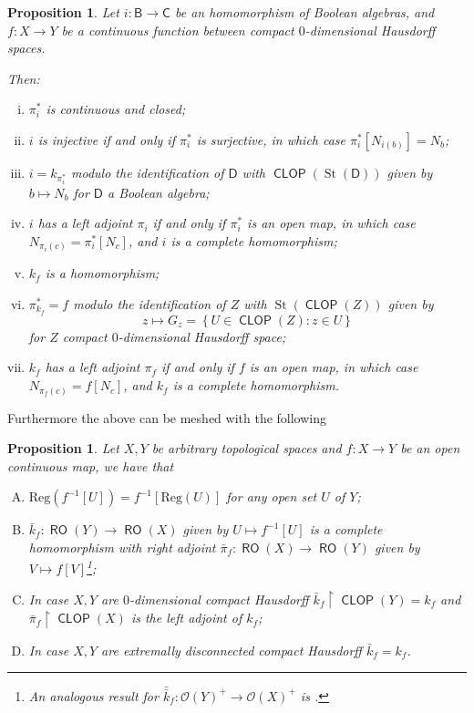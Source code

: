 \documentclass[11pt]{amsart}
\theoremstyle{plain}
\newtheorem{proposition}[theorem]{Proposition}
\theoremstyle{definition}
\theoremstyle{plain}
\theoremstyle{remark}
\DeclareMathOperator{\St}{St}
\DeclareMathOperator{\RO}{\mathsf{RO}}
\DeclareMathOperator{\CLOP}{\mathsf{CLOP}}
\newcommand{\bool}[1]{\mathsf{#1}}
\newcommand{\Reg}[1]{\mathrm{Reg}\left(#1\right)}
\newcommand{\bp}[1]{\left\lbrace #1 \right\rbrace}
\newcommand{\0}{\mathsf{0}}
\renewcommand{\1}{\mathsf{1}}
\renewcommand{\2}{\mathsf{2}}
\theoremstyle{definition}
\begin{document}
\begin{proposition}\label{prop:openadjpairs}
	Let $i: \bool{B} \rightarrow \bool{C}$ be an homomorphism of Boolean algebras, and
	$f:X\to Y$ be a continuous function between compact $0$-dimensional Hausdorff spaces. 
	
	
	Then:
	\begin{enumerate}[(i)]
	\item \label{prop:openadjpairs-1}
	$\pi^*_i$ is continuous and closed;
	\item \label{prop:openadjpairs-2}
	$i$ is injective if and only if $\pi^*_i$ is surjective, in which case $\pi^*_i[N_{i(b)}]=N_b$; 
	\item \label{prop:openadjpairs-3}
	$i=k_{\pi^*_i}$ modulo the identification of $\bool{D}$ with $\CLOP(\St(\bool{D}))$ given by 
	$b\mapsto N_b$ for $\bool{D}$ a Boolean algebra;
	\item \label{prop:openadjpairs-4}
	$i$ has a left adjoint $\pi_i$ if and only if $\pi^*_i$ is an open map, in which case $N_{\pi_i(c)}=\pi^*_i[N_c]$, and $i$ is a complete homomorphism;
	\item \label{prop:openadjpairs-5}
	$k_f$ is a homomorphism;
	\item \label{prop:openadjpairs-6}
	$\pi^*_{k_f}=f$ modulo the identification of $Z$ with $\St(\CLOP(Z))$ given by 
	\[
	z\mapsto G_z=\bp{U\in\CLOP(Z): z\in U}
	\] 
	for $Z$ compact $0$-dimensional Hausdorff space;
	\item  \label{prop:openadjpairs-7}
	 $k_f$ has a left adjoint $\pi_f$ if and only if $f$ is an open map, in which case 
	 $N_{\pi_f(c)}=f[N_c]$, and $k_f$ is a complete homomorphism.
	 \end{enumerate}
	 \end{proposition}
	 
	 Furthermore the above can be meshed with the following
	 \begin{proposition} \label{thm:openmap-->adjoint}
	 Let $X,Y$ be arbitrary topological spaces and
	  $f:X\to Y$ be an open continuous map, we have that
	 \begin{enumerate}[(A)]
	 \item\label{cor:openmapscomplhomI}  
	 $\Reg{f^{-1}[U]}=f^{-1}[\Reg{U}]$ for any open set $U$ of $Y$;
	 \item\label{cor:openmapscomplhomII} 
	 $\bar{k}_f:\RO(Y)\to\RO(X)$ given by $U\mapsto f^{-1}[U]$ is a complete homomorphism
	 with right adjoint $\bar{\pi}_f:\RO(X)\to\RO(Y)$ given by $V\mapsto f[V]$\footnote{An analogous result for $\bar{\bar{k}}_f:\mathcal{O}(Y)^+\to\mathcal{O}(X)^+$ is \cite[Chapter C3 Lemma 3.1.10]{JohnElephant}.};
	 \item \label{cor:openmapscomplhomIII} 
	 In case $X,Y$ are $0$-dimensional compact Hausdorff $\bar{k}_f\restriction\CLOP(Y)=k_f$
	 and $\bar{\pi}_f\restriction\CLOP(X)$ is the left adjoint of $k_f$;
	 \item \label{cor:openmapscomplhomIV} 
	 In case $X,Y$ are extremally disconnected compact Hausdorff $\bar{k}_f=k_f$.
	 \end{enumerate}
	 \end{proposition}
\end{document}
